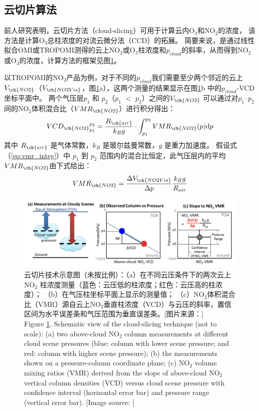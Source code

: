 \subsection{云切片算法} \label{sec:cloud-slicing}

前人研究表明，云切片方法（cloud-slicing）可用于计算云内O$_3$和NO$_2$的浓度，
该方法是计算O$_3$总柱浓度的对流云微分法（CCD）的拓展\citep{Ziemke.1998,Ziemke.2001}。
简要来说，是通过线性拟合OMI或TROPOMI测得的云上NO$_2$或O$_3$柱浓度和$p_{cloud}$的斜率，从而得到NO$_2$或O$_3$的浓度，计算方法的框架见图\ref{fig:cloud-slicing_schematic}。

以TROPOMI的NO$_2$产品为例，对于不同的$p_{cloud}$我们需要至少两个邻近的云上$V_{\ch{NO2}}$（$V_{\ch{NO2Vis}}$，图\ref{fig:cloud-slicing_schematic}a），这两个测量的结果显示在图\ref{fig:cloud-slicing_schematic}b 中的$p_{cloud}$-VCD 坐标平面中。
两个气压层$p_1$ 和 $p_2$（$p_1$ $<$ $p_2$）之间的$V_{\ch{NO2}}$
可以通过对$p_1$--$p_2$间的NO$_2$体积混合比（$VMR_{\ch{NO2}}$）进行积分得出：
\begin{equation} \label{eq:vmr_integ}
{VCD_{\ch{NO2}}}_{p_1}^{p_2}=\frac{R_{\ch{air}}}{k_Bg} \cdot \int_{p_1}^{p_2} VMR_{\ch{NO2}}(p) \mathrm{d} p
\end{equation}
其中 $R_{\ch{air}}$ 是气体常数，$k_B$ 是玻尔兹曼常数，$g$ 是重力加速度。
假设式（\ref{eq:vmr_integ}）中 $p_1$ 到 $p_2$ 范围内的混合比恒定，此气压层内的平均$VMR_{\ch{NO2}}$由下式给出：
\begin{equation}
VMR_{\ch{NO2}} = \frac{\Delta V_{\ch{NO2Vis}}}{\Delta p} \frac{k_B g}{R_{air}}
\end{equation}

\begin{figure}[H]
\centering
\includegraphics[width=\textwidth]{./figures/cloud-slicing_schematic.png}
\caption{云切片技术示意图（未按比例）：（a）在不同云压条件下的两次云上NO$_2$ 柱浓度测量（蓝色：云压低的柱浓度；红色：云压高的柱浓度）；
（b）在气压柱坐标平面上显示的测量值； （c）NO$_2$体积混合比（VMR）源自云上NO$_2$垂直柱浓度（VCD）与云压的斜率，置信区间为水平误差条和气压范围为垂直误差条。[图片来源：\citet{Choi.2014}]\\
Figure \ref{fig:cloud-slicing_schematic}. Schematic view of the cloud-slicing technique (not to scale):
(a) two above-cloud NO$_2$ column measurements at different cloud scene pressures (blue: column with lower scene pressure; and red: column with higher scene pressure);
(b) the measurements shown on a pressure-column coordinate plane;
(c) NO$_2$ volume mixing ratios (VMR) derived from the slope of above-cloud NO$_2$ vertical column densities (VCD) versus cloud scene pressure with confidence interval (horizontal error bar) and pressure range (vertical error bar). [Image source: \citet{Choi.2014}]
}
\label{fig:cloud-slicing_schematic}
\end{figure}

